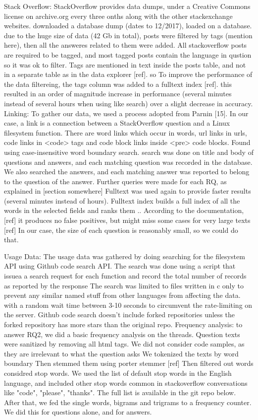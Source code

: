 Stack Overflow: StackOverflow provides data dumps, under a Creative Commons license on archive.org every three onths along with the other stackexchange websites. downloaded a database dump (dates to 12/2017), loaded on a database. due to the huge size of data (42 Gb in total), posts were filtered by tags (mention here), then all the answeres related to them were added. All stackoverflow posts are required to be tagged, and most tagged posts contain the language in qustion so it was ok to filter. Tags are mentioned in text inside the posts table, and not in a separate table as in the data explorer [ref]. so To improve the performance of the data filtereing, the tags column was added to a fulltext index [ref]. this resulted in an order of magnitude increase in performance (several minutes instead of several hours when using like search) over a slight decrease in accuracy.
Linking: To gather our data, we used a process adopted from Parnin [15].
In our case, a link is a connection between a StackOverflow question and a Linux filesystem function. There are word links which occur in words, url links in urls, code links in <code> tags and code block links inside <pre> code blocks.
Found using case-insensitive word boundary search.
search was done on title and body of questions and answers, and each matching question was recorded in the database. We also searched the answers, and each matching answer was reported to belong to the question of the answer. Further queries were made for each RQ, as explained in [section somewhere]
Fulltext was used again to provide faster results (several minutes instead of hours). Fulltext index builds a full index of all the words in the selected fields and ranks them .. %
 According to the documentation, [ref] it produces no false positives, but might miss some cases for very large texts [ref]
In our case, the size of each question is reasonably small, so we could do that.

Usage Data: The usage data was gathered by doing searching for the filesystem API using Github code search API. The search was done using a script that issuea a search request for each function and record the total number of records as reported by the response The search was limited to files written in c only to prevent any similar named stuff from other languages from affecting the data.
with a random wait time between 3-10 seconds to circumvent the rate-limiting on the server.
Github code search doesn't include forked repositories unless the forked repository has more stars than the original repo.
Frequency analysis: to answer RQ2, we did a basic frequency analysis on the threads.
Question texts were sanitized by removing all html tags.
We did not consider code samples, as they are irrelevant to what the question asks
We tokenized the texts by word boundary
Then stemmed them using porter stemmer [ref]
Then filtered out words considred stop words. We used the list of default stop words in the English language, and included other stop words common in stackoverflow conversations like "code", "please", "thanks". The full list is available in the git repo below.
After that, we fed the single words, bigrams and trigrams to a frequency counter.
We did this for questions alone, and for answers.

